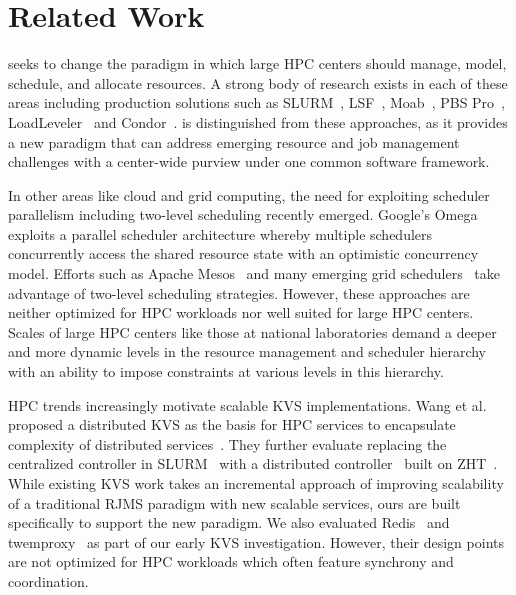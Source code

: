 \section{Related Work}
\flux seeks to change the paradigm in which 
large HPC centers should manage, model, schedule, and
allocate resources. 
A strong body of research exists in each of these areas 
including production solutions such as SLURM~\cite{Jette02slurm}, 
LSF~\cite{LSF}, Moab~\cite{MOAB}, 
PBS Pro~\cite{PSBPro}, LoadLeveler~\cite{LL}
and Condor~\cite{Litzkow88}.
\flux is distinguished from these approaches, as it provides
a new paradigm that can address emerging resource and
job management challenges 
with a center-wide purview under one common 
software framework. 

In other areas like cloud and grid computing, the need 
for exploiting scheduler parallelism including two-level 
scheduling recently emerged. 
Google's Omega~\cite{Omega} exploits 
a parallel scheduler architecture whereby multiple
schedulers concurrently access the shared resource state
with an optimistic concurrency model. Efforts
such as Apache Mesos~\cite{Mesos} and many emerging
grid schedulers~\cite{MultilevelGrid,Oar} 
take advantage of two-level scheduling strategies.
However, these approaches are neither optimized for HPC workloads 
nor well suited for large HPC centers. 
Scales of large HPC centers like those at national laboratories
demand a deeper and more dynamic levels in the resource management 
and scheduler hierarchy with an ability to impose constraints 
at various levels in this hierarchy.

HPC trends increasingly motivate scalable KVS implementations. 
Wang et al. proposed a distributed KVS 
as the basis for HPC services to encapsulate
complexity of distributed services~\cite{Wang:2013:USE:2503210.2503239}.
%
They further evaluate replacing the centralized controller in
SLURM~\cite{Jette02slurm} with a distributed controller~\cite{Slurmpp}
built on ZHT~\cite{Li:2013:ZLR:2510661.2511401}.
While existing KVS work takes an incremental approach of improving 
scalability of a traditional RJMS paradigm with new scalable services,
ours are built specifically to support the new paradigm. 
We also evaluated Redis~\cite{Redis} and twemproxy~\cite{Twemproxy}
as part of our early KVS investigation.
However, their design points are not optimized
for HPC workloads which often feature synchrony and coordination. 
%

